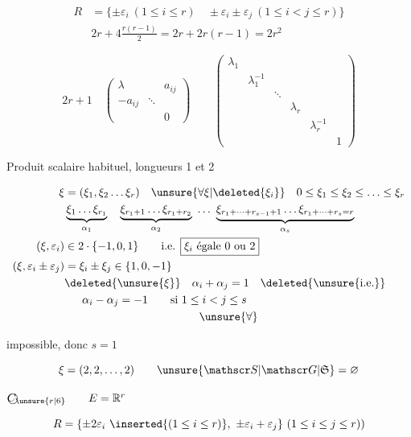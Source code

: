 \[
\begin{aligned}
R&=\{\pm\varepsilon_i\ (1\leq i\leq r)\quad\pm\varepsilon_i\pm\varepsilon_j\ (1\leq i<j\leq r)\}\\
&2r+4\frac{r(r-1)}2=2r+2r(r-1)=2r^2
\end{aligned}
\]

\[
2r+1\quad
\begin{pmatrix}\lambda&&a_{ij}\\-a_{ij}&\ddots&\\&&0\end{pmatrix}
\qquad
\begin{pmatrix}\lambda_1\\&\lambda_1^{-1}\\&&\ddots\\&&&\lambda_r\\&&&&\lambda_r^{-1}\\&&&&&1\end{pmatrix}
\]

Produit scalaire habituel, longueurs 1 et 2

\[
\begin{aligned}
\xi&=(\xi_1,\xi_2\ldots\xi_r)\quad\unsure{\forall\xi|\deleted{\xi_i}}\quad0\leq\xi_1\leq\xi_2\leq\ldots\leq\xi_r\\
&\underbrace{\xi_1\ldots\xi_{r_1}}_{\alpha_1}\quad\underbrace{\xi_{r_1+1}\ldots\xi_{r_1+r_2}}_{\alpha_2}\ \ldots\
\underbrace{\xi_{r_1+\cdots+r_{s-1}+1}\ldots\xi_{r_1+\cdots+r_s=r}}_{\alpha_s}\\
(\xi,\varepsilon_i)&\in 2\cdot\{-1,0,1\}\qquad\text{i.e. }\boxed{\xi_i\text{ égale }0\text{ ou }2}\\
(\xi,\varepsilon_i\pm\varepsilon_j)&=\xi_i\pm\xi_j\in\{1,0,-1\}\\
&\deleted{\unsure{\xi}}\quad\alpha_i+\alpha_j=1\quad\deleted{\unsure{\text{i.e.}}}\\
&\phantom{x}\quad\alpha_i-\alpha_j=-1\qquad\text{si }1\leq i<j\leq s\\
&\hspace{12em}\unsure{\forall}
\end{aligned}
\]

 impossible, donc $s=1$

\[\xi=(2,2,\ldots,2)\qquad\unsure{\mathscr S|\mathscr G|\mathfrak S}=\varnothing\]

$\text{\textcircled{$C_{\unsure{r|6}}$}}\qquad E=\mathbb R^r$

\[
R=\{\pm2\varepsilon_i\ \inserted{(1\leq i\leq r)},\ \pm\varepsilon_i+\varepsilon_j\}\ (1\leq i\leq j\leq r))
\]

